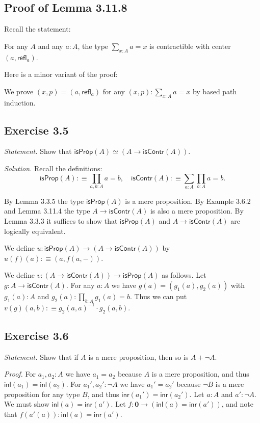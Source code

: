 \documentclass[12pt]{article}
\newcommand{\mbf}{\mathbf}
\newcommand{\msf}{\mathsf}
\newcommand{\de}{:\equiv}
\newcommand{\nn}{\noindent}
\newcommand{\refl}{\mathsf{refl}}
\begin{document}

\subsection{Proof of Lemma 3.11.8} 

Recall the statement: 

For any $A$ and any $a:A$, the type $\sum_{x:A}a=x$ is contractible with center $(a,\refl_a)$. 

Here is a minor variant of the proof:

We prove $(x,p)=(a,\refl_a)$ for any $(x,p):\sum_{x:A}a=x$ by based path induction.


\subsection{Exercise 3.5}

\emph{Statement.} Show that $\msf{isProp}(A)\simeq(A\to\msf{isContr}(A))$. 

\nn\emph{Solution.} Recall the definitions: 
$$
\msf{isProp}(A)\de\prod_{a,b:A}a=b,\quad\msf{isContr}(A)\de\sum_{a:A}\prod_{b:A}a=b.
$$

By Lemma 3.3.5 the type $\msf{isProp}(A)$ is a mere proposition. By Example 3.6.2 and Lemma 3.11.4 the type $A\to\msf{isContr}(A)$ is also a mere proposition. By Lemma 3.3.3 it suffices to show that $\msf{isProp}(A)$ and $A\to\msf{isContr}(A)$ are logically equivalent. 

We define $u:\msf{isProp}(A)\to(A\to\msf{isContr}(A))$ by $u(f)(a)\de(a,f(a,-))$. 

We define $v:(A\to\msf{isContr}(A))\to\msf{isProp}(A)$ as follows. Let $g:A\to\msf{isContr}(A)$. For any $a:A$ we have $g(a)=(g_1(a),g_2(a))$ with $g_1(a):A$ and $g_2(a):\prod_{b:A}g_1(a)=b$. Thus we can put $v(g)(a,b)\de g_2(a,a)^{-1}\cdot g_2(a,b)$.



\subsection{Exercise 3.6}

\emph{Statement.} Show that if $A$ is a mere proposition, then so is $A+\neg A$.

\nn\emph{Proof.} For $a_1,a_2:A$ we have $a_1=a_2$ because $A$ is a mere proposition, and thus $\msf{inl}(a_1)=\msf{inl}(a_2)$. For $a_1',a_2':\neg A$ we have $a_1'=a_2'$ because $\neg B$ is a mere proposition for any type $B$, and thus $\msf{inr}(a_1')=\msf{inr}(a_2')$. Let $a:A$ and $a':\neg A$. We must show $\msf{inl}(a)=\msf{inr}(a')$. Let $f:\mbf0\to(\msf{inl}(a)=\msf{inr}(a'))$, and note that $f(a'(a)):\msf{inl}(a)=\msf{inr}(a')$.
\end{document}
